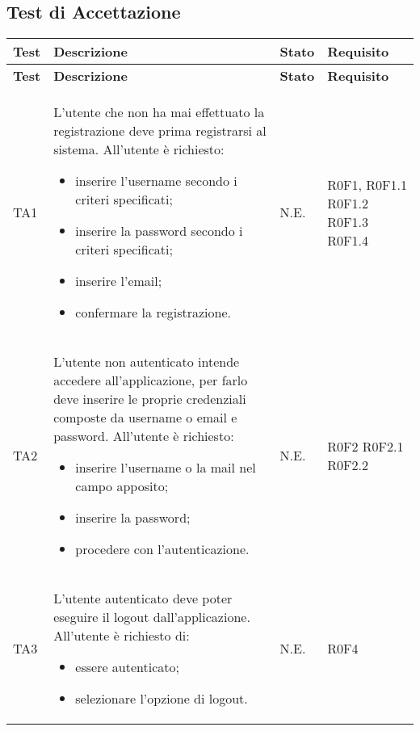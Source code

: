 \subsection{Test di Accettazione}
\begin{longtable}{p{2cm}!{\VRule[1pt]}p{7.5cm}!{\VRule[1pt]}p{1cm}!{\VRule[1pt]}p{2.5cm}}
\color{white} \textbf{Test} & \color{white} \textbf{Descrizione}  & \color{white} \textbf{Stato}  & \color{white} \textbf{Requisito}\\ 
\endfirsthead 
{} 
\color{white} \textbf{Test} & \color{white} \textbf{Descrizione}  & \color{white} \textbf{Stato}  & \color{white} \textbf{Requisito}\\  
\endhead 
TA1 & L'utente che non ha mai effettuato la registrazione deve prima registrarsi al sistema. All'utente è richiesto: \begin{itemize}
\item inserire l'username secondo i criteri specificati;
\item inserire la password secondo i criteri specificati;
\item inserire l'email;
\item confermare la registrazione.
\end{itemize} & N.E. & R0F1, R0F1.1 \newline R0F1.2 R0F1.3 \newline R0F1.4\\

TA2 & L'utente non autenticato intende accedere all'applicazione, per farlo deve inserire le proprie credenziali composte da username o email e password. All'utente è richiesto: \begin{itemize}
\item inserire l'username o la mail nel campo apposito;
\item inserire la password;
\item procedere con l'autenticazione.
\end{itemize} & N.E. & R0F2 R0F2.1 \newline R0F2.2\\

TA3 & L'utente autenticato deve poter eseguire il logout dall'applicazione. All'utente è richiesto di:\begin{itemize}
\item essere autenticato;
\item selezionare l'opzione di logout.
\end{itemize} & N.E. & R0F4\\


\end{longtable}
